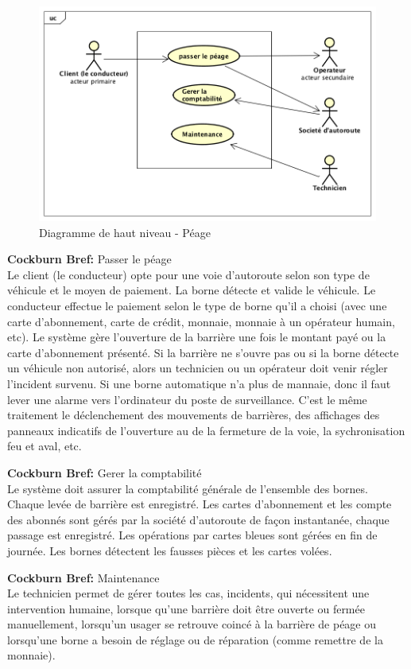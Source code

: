\begin{figure}[h]
    \centering
    \includegraphics[scale=0.50]{02_Desenvolvimento/TD2/images/UseCaseDiagram.png}
    \caption{Diagramme de haut niveau - Péage}
    \label{fig:hautNiveau}
\end{figure}

\textbf{Cockburn Bref:} Passer le péage\\
Le client (le conducteur) opte pour une voie d’autoroute selon son type de véhicule et le moyen de paiement. La borne détecte et valide le véhicule. Le conducteur effectue le paiement selon le type de borne qu’il a choisi (avec une carte d’abonnement, carte de crédit, monnaie, monnaie à un opérateur humain, etc). Le système gère l’ouverture de la barrière une fois le montant payé ou la carte d’abonnement présenté. Si la barrière ne s’ouvre pas ou si la borne détecte un véhicule non autorisé, alors un technicien ou un opérateur doit venir régler l’incident survenu. Si une borne automatique n'a plus de mannaie, donc il faut lever une alarme vers l'ordinateur du poste de surveillance. C'est le même traitement le déclenchement des mouvements de barrières, des affichages des panneaux indicatifs de l'ouverture au de la fermeture de la voie, la sychronisation feu et aval, etc.

\textbf{Cockburn Bref:} Gerer la comptabilité \\
Le système doit assurer la comptabilité générale de l’ensemble des bornes. Chaque levée de barrière est enregistré. Les cartes d’abonnement et les compte des abonnés sont gérés par la société d’autoroute de façon instantanée, chaque passage est enregistré. Les opérations par cartes bleues sont gérées en fin de journée. Les bornes détectent les fausses pièces et les cartes volées.

\textbf{Cockburn Bref:} Maintenance  \\
Le technicien permet de gérer toutes les cas, incidents, qui nécessitent une intervention humaine, lorsque qu’une barrière doit être ouverte ou fermée manuellement, lorsqu’un usager se retrouve coincé à la barrière de péage ou lorsqu’une borne a besoin de réglage ou de réparation (comme remettre de la monnaie).